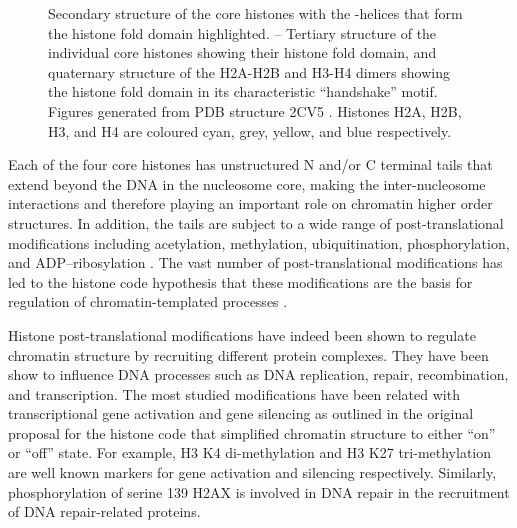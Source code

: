 \begin{figure}
                     {
                       Secondary structure of the core histones with
                       the \textalpha-helices that form the histone
                       fold domain highlighted.
                       --%
                       Tertiary structure of the individual core
                       histones showing their histone fold domain, and
                       quaternary structure of the H2A-H2B and H3-H4
                       dimers showing the histone fold domain in its
                       characteristic ``handshake'' motif.  Figures
                       generated from PDB structure 2CV5
                       \citep{tsunaka2005-2cv5}.  Histones H2A, H2B,
                       H3, and H4 are coloured cyan, grey, yellow, and
                       blue respectively.}
      \end{figure}


      Each of the four core histones has unstructured N and/or C
      terminal tails that extend beyond the DNA in the nucleosome core,
      making the inter-nucleosome interactions and therefore
      playing an important
      role on chromatin higher order structures.
      In addition, the tails are subject to a wide range of
      post-translational modifications
      including acetylation, methylation, ubiquitination, phosphorylation,
      and ADP--ribosylation \citep{bannister2011ptm-review}.
      The vast number of post-translational modifications has led to the
      histone code hypothesis that these modifications are the basis for
      regulation of chromatin-templated processes \citep{jenuwein200histone-code}.


      Histone post-translational modifications have indeed been shown to
      regulate chromatin structure
      by recruiting different protein complexes.
      They have been show to influence
      DNA processes such as DNA replication, repair, recombination,
      and transcription.
      The most studied modifications have been related with transcriptional
      gene activation and gene silencing as outlined in
      the original proposal for the histone code \citep{jenuwein200histone-code}
      that simplified chromatin structure to either ``on'' or ``off'' state.
      For example,
      H3 K4 di-methylation and H3 K27 tri-methylation are well known
      markers for gene activation and silencing respectively.
      Similarly,
      phosphorylation of serine 139 H2AX is involved in DNA repair
      in the recruitment of DNA repair-related proteins.

